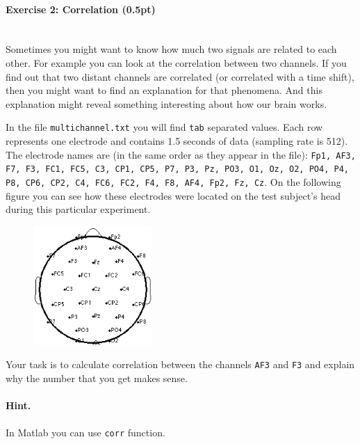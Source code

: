 \documentclass[a4paper,11pt]{article}
\newenvironment{exercise}[3]{\paragraph{Exercise #1: #2 (#3pt)}\ \\}{
\medskip}
\begin{document}
%
%
\begin{exercise}{2}{Correlation}{0.5}
Sometimes you might want to know how much two signals are related to each other. For example you can look at the correlation between two channels. If you find out that two distant channels are correlated (or correlated with a time shift), then you might want to find an explanation for that phenomena. And this explanation might reveal something interesting about how our brain works.

In the file \texttt{multichannel.txt} you will find \texttt{tab} separated values. Each row represents one electrode and contains 1.5 seconds of data (sampling rate is 512). The electrode names are (in the same order as they appear in the file): \texttt{Fp1, AF3, F7, F3, FC1, FC5, C3, CP1, CP5, P7, P3, Pz, PO3, O1, Oz, O2, PO4, P4, P8, CP6, CP2, C4, FC6, FC2, F4, F8, AF4, Fp2, Fz, Cz}. On the following figure you can see how these electrodes were located on the test subject's head during this particular experiment.
\begin{figure}[H]
   \centering
   \includegraphics[width=0.4\textwidth]{locations.png} 
\end{figure}
Your task is to calculate correlation between the channels \texttt{AF3} and \texttt{F3} and explain why the number that you get makes sense.
\paragraph{Hint.} In Matlab you can use \texttt{corr} function.
\end{exercise}
\end{document}
